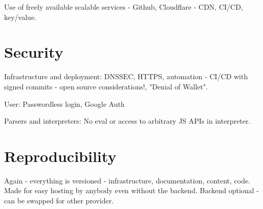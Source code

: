 Use of freely available scalable services - Github, Cloudflare - CDN, CI/CD, key/value.

\section{Security}

Infrastructure and deployment: DNSSEC, HTTPS, automation - CI/CD with signed commits - open source considerations!, "Denial of Wallet".

User: Passwordless login, Google Auth

Parsers and interpreters: No eval or access to arbitrary JS APIs in interpreter.

\section{Reproducibility}

Again - everything is versioned - infrastructure, documentation, content, code.
Made for easy hosting by anybody even without the backend.
Backend optional - can be swapped for other provider.
